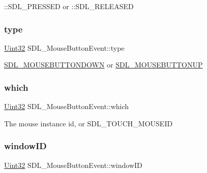 \+::\+S\+D\+L\+\_\+\+P\+R\+E\+S\+S\+ED or \+::\+S\+D\+L\+\_\+\+R\+E\+L\+E\+A\+S\+ED \mbox{\label{struct_s_d_l___mouse_button_event_af64cb09ea68b8081ecc8ee498552e3d7}} 
\subsubsection{\texorpdfstring{type}{type}}
{\footnotesize\ttfamily \hyperlink{_s_d_l__stdinc_8h_add440eff171ea5f55cb00c4a9ab8672d}{Uint32} S\+D\+L\+\_\+\+Mouse\+Button\+Event\+::type}

\hyperlink{_s_d_l__events_8h_a3b589e89be6b35c02e0dd34a55f3fccaa9267166e1536dfa8b0daa98c0afa9052}{S\+D\+L\+\_\+\+M\+O\+U\+S\+E\+B\+U\+T\+T\+O\+N\+D\+O\+WN} or \hyperlink{_s_d_l__events_8h_a3b589e89be6b35c02e0dd34a55f3fccaa4ab85278398d29b9e50f500aad2b952b}{S\+D\+L\+\_\+\+M\+O\+U\+S\+E\+B\+U\+T\+T\+O\+N\+UP} \mbox{\label{struct_s_d_l___mouse_button_event_a366aef59a0f393afc8a3561e741825df}} 
\subsubsection{\texorpdfstring{which}{which}}
{\footnotesize\ttfamily \hyperlink{_s_d_l__stdinc_8h_add440eff171ea5f55cb00c4a9ab8672d}{Uint32} S\+D\+L\+\_\+\+Mouse\+Button\+Event\+::which}

The mouse instance id, or S\+D\+L\+\_\+\+T\+O\+U\+C\+H\+\_\+\+M\+O\+U\+S\+E\+ID \mbox{\label{struct_s_d_l___mouse_button_event_ab3b855d4b543b5d02fcf5d56e4421393}} 
\subsubsection{\texorpdfstring{window\+ID}{windowID}}
{\footnotesize\ttfamily \hyperlink{_s_d_l__stdinc_8h_add440eff171ea5f55cb00c4a9ab8672d}{Uint32} S\+D\+L\+\_\+\+Mouse\+Button\+Event\+::window\+ID}


